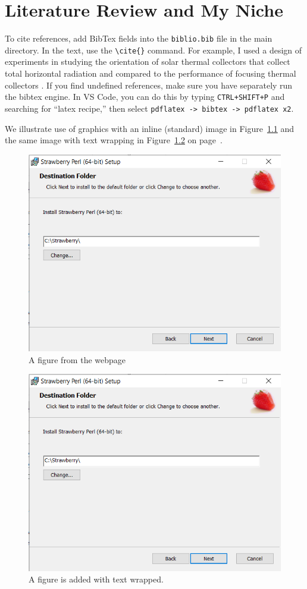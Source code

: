 \chapter{Literature Review and My Niche}
\color{red}

To cite references, add BibTex fields into the \verb|biblio.bib| file in the main directory. In the text, use the \verb|\cite{}| command. For example, I used a design of experiments \citep{wu2011experiments} in studying the orientation of solar thermal collectors \citep{duffie2020solar} that collect total horizontal radiation \citep{hottel1976simple} and compared to the performance of focusing thermal collectors \citep{stine2001power}. 
If you find undefined references, make sure you have separately run the bibtex engine. In VS Code, you can do this by typing \verb|CTRL+SHIFT+P| and searching for ``latex recipe,'' then select \verb|pdflatex -> bibtex -> pdflatex x2|.

We illustrate use of graphics with an inline (standard) image in Figure~\ref{fig:1} and the same image with text wrapping in Figure~\ref{fig:2} on page~\pageref{fig:2}. 

\begin{figure}[htbp]
    \centering
    \includegraphics[width=0.5\linewidth]{image_001.png}
    \caption{A figure from the webpage}
    \label{fig:1}
\end{figure}

\color{black}

\lipsum[30-31]


\begin{figure}  %
    \centering
    \includegraphics[width=\linewidth]{image_001.png}
    \caption{A figure is added with text wrapped.}
    \label{fig:2}
    \vspace{-2ex}
\end{figure}


\lipsum[32-33]
